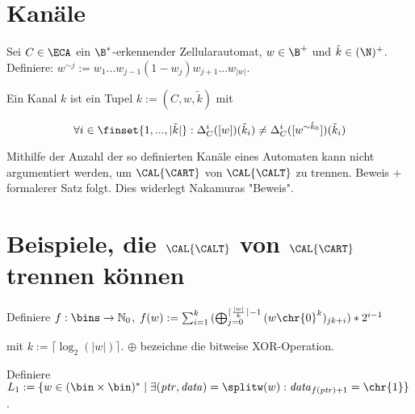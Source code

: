 
\section{Kanäle}

\begin{definition}
    Sei $C \in \ECA$ ein $\B^*$-erkennender Zellularautomat, $w \in \B^+$ und $\tilde{k} \in (\N)^+$.
    Definiere: $w^{\sim j} := w_1...w_{j-1}(1 - w_j)w_{j+1}...w_{|w|}$.
    
    Ein Kanal $k$ ist ein Tupel $k := (C, w, \tilde{k})$ mit 
    
    \[
        \forall i \in \finset{1, ..., |\tilde{k}|}: \Delta_C^i([w])(\tilde{k}_i) \neq \Delta_C^i([w ^ {\sim \tilde{k}_0 }])(\tilde{k}_i)
    \]
    
\end{definition}

\begin{satz}
    Mithilfe der Anzahl der so definierten Kanäle eines Automaten kann nicht argumentiert werden, um $\CAL{\CART}$ von $\CAL{\CALT}$ zu trennen.
    Beweis + formalerer Satz folgt. Dies widerlegt Nakamuras "Beweis".
\end{satz}






\section{Beispiele, die $\CAL{\CALT}$ von $\CAL{\CART}$ trennen können}

\begin{definition}

    Definiere $f: \bins \to \mathbb{N}_0$,
    $f(w) := \sum_{i = 1}^{k}{  ({\bigoplus_{j = 0}^{ \lceil \frac{|w|}{k} \rceil - 1}{(w \chr{0}^k)_{jk + i} } }) * 2^{i - 1}  } $
    
    mit $k := \lceil \log_2(|w|) \rceil$. $\oplus$ bezeichne die bitweise XOR-Operation.

    
    Definiere $L_1 := \{ w \in (\bin \times \bin)^* \; | \; \exists (\mathit{ptr}, \mathit{data}) = \splitw(w): \mathit{data}_{f(\mathit{ptr}) + 1} = \chr{1}  \}$.
\end{definition}

